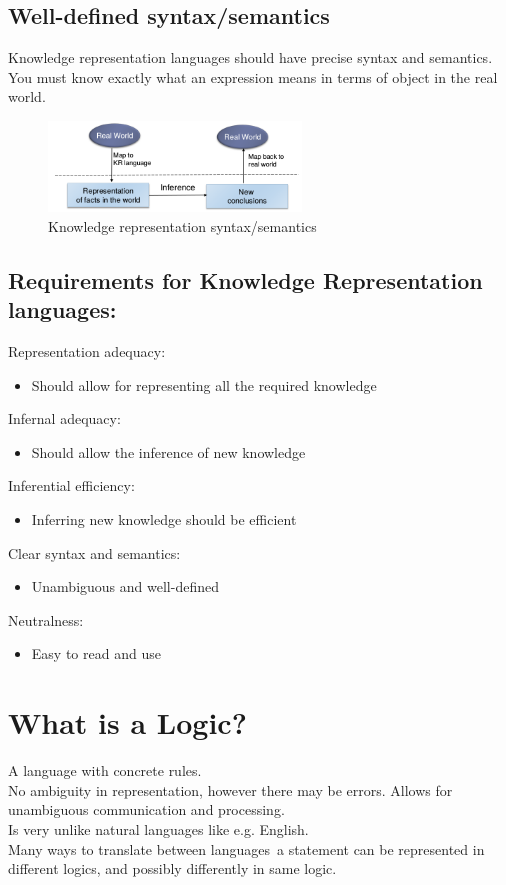 \subsection{Well-defined syntax/semantics}
Knowledge representation languages should have precise syntax and semantics.\\
You must know exactly what an expression means in terms of object in the real world.\\
\begin{figure}[h]
\centering
\includegraphics[width=0.6\textwidth]{chap_5Pics/Selection_018.png} 
\caption{Knowledge representation syntax/semantics}
\end{figure}


\subsection{Requirements for Knowledge Representation languages:}
Representation adequacy:
\begin{itemize}
\item Should allow for representing all the required knowledge
\end{itemize}

Infernal adequacy:
\begin{itemize}
\item Should allow the inference of new knowledge
\end{itemize}

Inferential efficiency:
\begin{itemize}
\item Inferring new knowledge should be efficient
\end{itemize}

Clear syntax and semantics:
\begin{itemize}
\item Unambiguous and well-defined
\end{itemize}

Neutralness:
\begin{itemize}
\item Easy to read and use
\end{itemize}

\section{What is a Logic?}
A language with concrete rules.\\
No ambiguity in representation, however there may be errors. Allows for unambiguous communication and processing. \\
Is very unlike natural languages like e.g. English.\\
Many ways to translate between languages\ a statement can be represented in different logics, and possibly differently in same logic. \\

